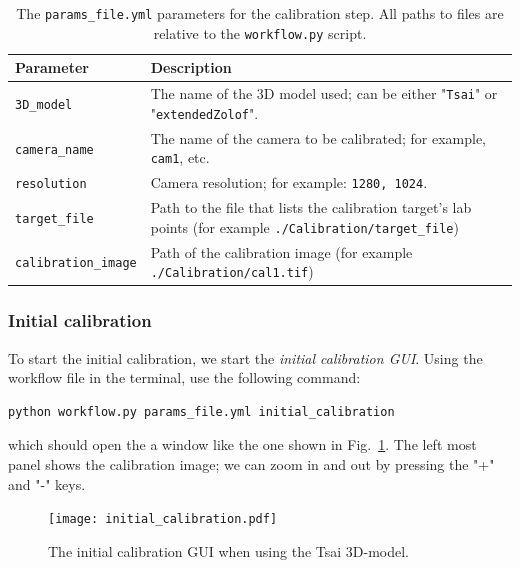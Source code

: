 \documentclass[10pt,a4paper]{article}
\begin{document}
\begin{table}
	\centering
	\caption{The \texttt{params\_file.yml} parameters for the calibration step. All paths to files are relative to the \texttt{workflow.py} script. \label{tab:cal_paramsfile}}
	\begin{tabular}{l m{10cm}}
		\hline
		Parameter & Description\\[.2cm]
		\hline
		
		\texttt{3D\_model} & The name of the 3D model used; can be either "\texttt{Tsai}" or "\texttt{extendedZolof}". \\[.2cm]
		
		\texttt{camera\_name} & The name of the camera to be calibrated; for example, \texttt{cam1}, etc. \\[.2cm]
		
		\texttt{resolution} & Camera resolution; for example: \texttt{1280, 1024}. \\[.2cm]
		
		\texttt{target\_file} & Path to the file that lists the calibration target's lab points (for example \texttt{./Calibration/target\_file}) \\[.2cm]
		
		\texttt{calibration\_image} & Path of the calibration image (for example \texttt{./Calibration/cal1.tif})\\[.2cm]
		
		\hline
	\end{tabular}
\end{table}





\subsubsection{Initial calibration}\label{sec:init_calibration}


To start the initial calibration, we start the \textit{initial calibration GUI}. Using the workflow file in the terminal, use the following command:
%
\begin{verbatim}
python workflow.py params_file.yml initial_calibration
\end{verbatim} 
%
which should open the a window like the one shown in Fig.~\ref{fig:init_cal_gui}. The left most panel shows the calibration image; we can zoom in and out by pressing the "+" and "-" keys. 

\begin{figure}
	\texttt{[image: initial\_calibration.pdf]}
	\caption{The initial calibration GUI when using the Tsai 3D-model. \label{fig:init_cal_gui}}
\end{figure}
\end{document}
